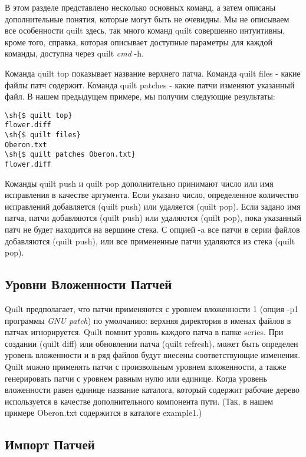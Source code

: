 \documentclass{article}
\newcommand{\quilt}[1]{\textsf{quilt #1}}
\renewcommand{\sh}[1]{\textsl{#1}}
\newcommand{\prog}[1]{\textit{#1}}
\begin{document}
В этом разделе представлено несколько основных команд, а затем описаны дополнительные понятия, которые могут быть не очевидны. Мы не описываем все особенности quilt здесь, так много команд quilt совершенно интуитивны, кроме того, справка, которая описывает доступные параметры для каждой команды, доступна через \quilt{\textit{cmd} -h}.

Команда \quilt{top} показывает название верхнего патча.
Команда \quilt{files} - какие файлы патч содержит. Команда \quilt{patches} - какие патчи изменяют указанный файл. В нашем предыдущем примере, мы получим следующие результаты:

\begin{small}
\begin{Verbatim}
\sh{$ quilt top}
flower.diff
\sh{$ quilt files}
Oberon.txt
\sh{$ quilt patches Oberon.txt}
flower.diff
\end{Verbatim}
\end{small}

Команды \quilt{push} и \quilt{pop} дополнительно принимают число или имя исправления в качестве аргумента. Если указано число, определенное количество исправлений добавляется (\quilt{push}) или удаляется (\quilt{pop}). Если задано имя патча, патчи добавляются (\quilt{push}) или удаляются (\quilt{pop}), пока указанный патч не будет находится на вершине стека. С опцией \textsf{-a} все патчи в серии файлов добавляются (\quilt{push}), или все примененные патчи удаляются из стека (\quilt{pop}).

\subsection{Уровни Вложенности Патчей}

Quilt предполагает, что патчи применяются с уровнем вложенности 1 (опция \textsf{-p1} программы  \prog{GNU patch}) по умолчанию: верхняя директория в именах файлов в патчах игнорируется. Quilt помнит уровнь каждого патча в папке \textsf{series}. При создании (\quilt{diff}) или обновлении патча (\quilt{refresh}), может быть определен уровень вложенности и в ряд файлов будут внесены соответствующие изменения. Quilt можно применять патчи с произвольным уровнем вложенности, а также генерировать патчи с уровнем равным нулю или единице. Когда уровень вложенности равен единице название каталога, который содержит рабочие дерево используется в качестве дополнительного компонента пути. (Так, в нашем примере \textsf{Oberon.txt} содержится в каталоге \textsf{example1}.)

\subsection{Импорт Патчей}
\end{document}
